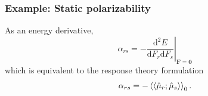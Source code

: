 \documentclass{beamer}
\begin{document}



\begin{frame}
  \frametitle{Example: Static polarizability}
  As an energy derivative,
  \begin{equation*}
    \alpha_{rs} = - \left. \frac{\text{d}^{2}E}{\text{d}F_{r}\text{d}F_{s}} \right|_{\mathbf{F}=\mathbf{0}}
  \end{equation*}
  which is equivalent to the response theory formulation
  \begin{equation*}
    \alpha_{rs} = - \braket{\braket{\hat{\mu}_{r};\hat{\mu}_{s}}}_{0}.
  \end{equation*}
\end{frame}
\end{document}
